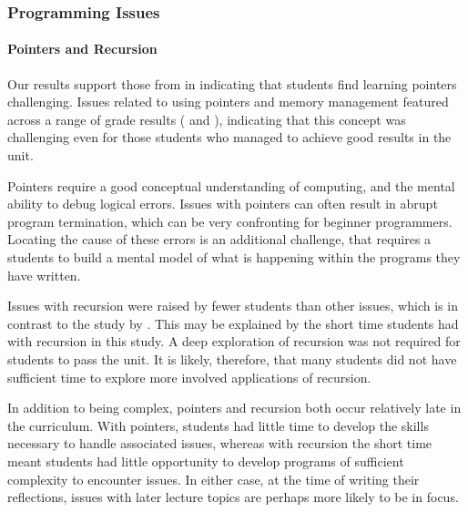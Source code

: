 
\subsubsection{Programming Issues}

\paragraph{Pointers and Recursion} %
\label{ssub:pointers_and_recursion}

Our results support those from \citet{Lahtinen:2005} in indicating that students find learning pointers challenging. Issues related to using pointers and memory management featured across a range of grade results ( and ), indicating that this concept was challenging even for those students who managed to achieve good results in the unit. 

Pointers require a good conceptual understanding of computing, and the mental ability to debug logical errors. Issues with pointers can often result in abrupt program termination, which can be very confronting for beginner programmers. Locating the cause of these errors is an additional challenge, that requires a students to build a mental model of what is happening within the programs they have written.

Issues with recursion were raised by fewer students than other issues, which is in contrast to the study by \citet{Lahtinen:2005}. This may be explained by the short time students had with recursion in this study. A deep exploration of recursion was not required for students to pass the unit. It is likely, therefore, that many students did not have sufficient time to explore more involved applications of recursion.

In addition to being complex, pointers and recursion both occur relatively late in the curriculum. With pointers, students had little time to develop the skills necessary to handle associated issues, whereas with recursion the short time meant students had little opportunity to develop programs of sufficient complexity to encounter issues.  In either case, at the time of writing their reflections, issues with later lecture topics are perhaps more likely to be in focus.



